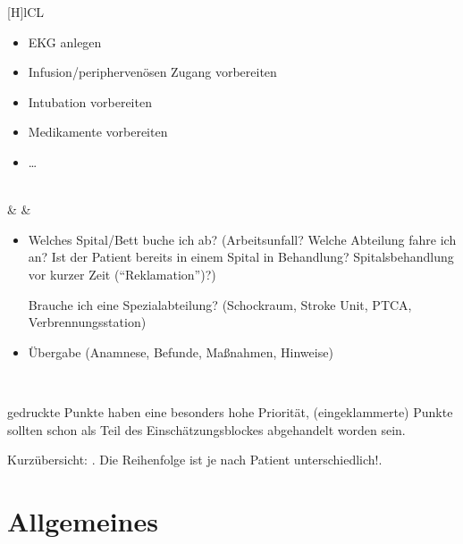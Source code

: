 {\begin{minipage}{\linewidth}
{\begin{tabulary}{\linewidth}[H]{lCL}
\begin{minipage}{\linewidth}
\begin{itemize}
  \item EKG anlegen
  \item Infusion/periphervenösen Zugang vorbereiten
  \item Intubation vorbereiten
  \item Medikamente vorbereiten
  \item \ldots
\end{itemize}
\end{minipage}
\\\addlinespace\midrule\addlinespace
{}
&
&
\begin{minipage}{\linewidth}
\begin{itemize}
  \item Welches Spital/Bett buche ich ab? {\tiny(Arbeitsunfall?
  Welche Abteilung fahre ich an? Ist der Patient bereits in
  einem Spital in Behandlung? Spitalsbehandlung vor kurzer
  Zeit (\enquote{Reklamation})?)}
  
  Brauche ich eine Spezialabteilung? {\tiny(Schockraum, Stroke
  Unit, PTCA, Verbrennungsstation)}
  \item Übergabe {\tiny(Anamnese, Befunde, Maßnahmen, Hinweise)}
\end{itemize}
\end{minipage}

\\\addlinespace\bottomrule
\end{tabulary}}

{\scriptsize{} gedruckte Punkte haben eine besonders hohe Priorität, (eingeklammerte) Punkte sollten schon als Teil des Einschätzungsblockes abgehandelt worden sein.}
\end{minipage}
}
{Kurzübersicht: .
Die Reihenfolge ist je nach Patient
unterschiedlich!\label{tab:checkliste-patientenmanagement}\label{tab:pam-weiterfuehrende}.}
{}

\clearpage

\section{Allgemeines}
